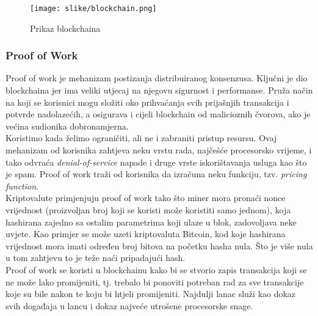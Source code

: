 \documentclass[12pt]{article}
\begin{document}
\begin{figure}[h!]
	\centering
	\texttt{[image: slike/blockchain.png]}
	\caption{Prikaz blockchaina}
\end{figure}


\subsubsection{Proof of Work}
Proof of work je mehanizam postizanja distribuiranog konsenzusa. Ključni je dio blockchaina jer ima veliki utjecaj na njegovu sigurnost i performanse. Pruža način na koji se korisnici mogu složiti oko prihvaćanja svih prijašnjih transakcija i potvrde nadolazećih, a osigurava i cijeli blockchain od malicioznih čvorova, ako je većina sudionika dobronamjerna.\cite{distributed-consensus}\\
Koristimo kada želimo ograničiti, ali ne i zabraniti pristup resursu. Ovaj mehanizam od korisnika zahtjeva neku vrstu rada, najčešće procesorsko vrijeme, i tako odvraća \textit{denial-of-service} napade i druge vrste iskorištavanja usluga kao što je spam. Proof of work traži od korisnika da izračuna neku funkciju, tzv. \textit{pricing function}.\cite{proof-of-work}\\
Kriptovalute primjenjuju proof of work tako što miner mora pronaći nonce vrijednost (proizvoljan broj koji se koristi može koristiti samo jednom), koja hashirana zajedno sa ostalim parametrima koji ulaze u blok, zadovoljava neke uvjete. Kao primjer se može uzeti kriptovaluta Bitcoin, kod koje hashirana vrijednost mora imati određen broj bitova na početku hasha nula. Što je više nula u tom zahtjevu to je teže naći pripadajući hash. \\
Proof of work se koristi u blockchainu kako bi se stvorio zapis transakcija koji se ne može lako promijeniti, tj. trebalo bi ponoviti potreban rad za sve transakcije koje su bile nakon te koju bi htjeli promijeniti. Najdulji lanac služi kao dokaz svih događaja u lancu i dokaz najveće utrošene procesorske snage.


\end{document}
